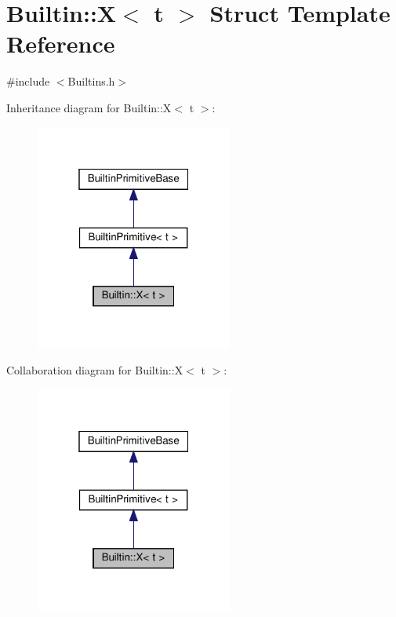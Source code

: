 \hypertarget{struct_builtin_1_1_x}{}\section{Builtin\+:\+:X$<$ t $>$ Struct Template Reference}
\label{struct_builtin_1_1_x}


{\ttfamily \#include $<$Builtins.\+h$>$}



Inheritance diagram for Builtin\+:\+:X$<$ t $>$\+:
\nopagebreak
\begin{figure}[H]
\begin{center}
\leavevmode
\includegraphics[width=184pt]{struct_builtin_1_1_x__inherit__graph}
\end{center}
\end{figure}


Collaboration diagram for Builtin\+:\+:X$<$ t $>$\+:
\nopagebreak
\begin{figure}[H]
\begin{center}
\leavevmode
\includegraphics[width=184pt]{struct_builtin_1_1_x__coll__graph}
\end{center}
\end{figure}
